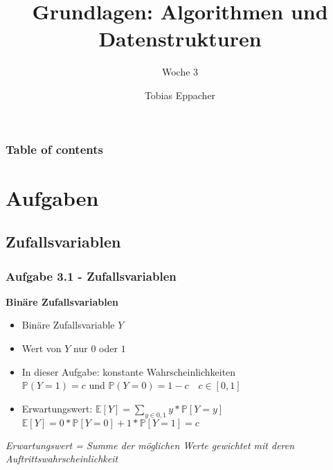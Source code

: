 \documentclass{beamer}
\title{Grundlagen: Algorithmen und Datenstrukturen}
\author{Tobias Eppacher}
\date{\presdatum}
\institute{School of Computation, Information and Technology}
\subtitle{Woche 3}
\begin{document}
\begin{frame}
	\titlepage
\end{frame}

\begin{frame}
	\frametitle{Table of contents}
	\tableofcontents[subsectionstyle=hide]
\end{frame}

\section{Aufgaben}

\subsection{Zufallsvariablen}
\begin{frame}
	\frametitle{Aufgabe 3.1 - Zufallsvariablen}
	\textbf{Binäre Zufallsvariablen} \\
	\begin{itemize}
		\item Binäre Zufallsvariable $Y$
		\item Wert von $Y$ nur $0$ oder $1$
		\item In dieser Aufgabe: konstante Wahrscheinlichkeiten \\
		      $\mathbb{P}(Y=1) = c$ und $\mathbb{P}(Y=0)=1-c \quad c \in [0, 1]$
		\item Erwartungswert: $\mathbb{E}[Y]=\sum_{y \in 0, 1} y * \mathbb{P}[Y=y]$ \\
		      $\mathbb{E}[Y]=0 * \mathbb{P}[Y=0] + 1 * \mathbb{P}[Y=1] = c$
	\end{itemize}
	\medskip
	\textit{Erwartungswert = Summe der möglichen Werte gewichtet mit deren Auftrittswahrscheinlichkeit}
\end{frame}
\end{document}
